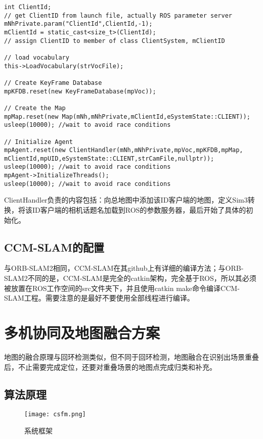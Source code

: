 \begin{verbatim}
int ClientId;
// get ClientID from launch file, actually ROS parameter server
mNhPrivate.param("ClientId",ClientId,-1);
mClientId = static_cast<size_t>(ClientId);
// assign ClientID to member of class ClientSystem, mClientID

// load vocabulary
this->LoadVocabulary(strVocFile);

// Create KeyFrame Database
mpKFDB.reset(new KeyFrameDatabase(mpVoc));

// Create the Map
mpMap.reset(new Map(mNh,mNhPrivate,mClientId,eSystemState::CLIENT));
usleep(10000); //wait to avoid race conditions

// Initialize Agent
mpAgent.reset(new ClientHandler(mNh,mNhPrivate,mpVoc,mpKFDB,mpMap,
mClientId,mpUID,eSystemState::CLIENT,strCamFile,nullptr));
usleep(10000); //wait to avoid race conditions
mpAgent->InitializeThreads();
usleep(10000); //wait to avoid race conditions
\end{verbatim}

ClientHandler负责的内容包括：向总地图中添加该ID客户端的地图，定义Sim3转换，将该ID客户端的相机话题名加载到ROS的参数服务器，最后开始了具体的初始化。


\subsection{CCM-SLAM的配置}

与ORB-SLAM2相同，CCM-SLAM在其github上有详细的编译方法；与ORB-SLAM2不同的是，CCM-SLAM是完全的catkin架构，完全基于ROS，所以其必须被放置在ROS工作空间的src文件夹下，并且使用catkin make命令编译CCM-SLAM工程。需要注意的是最好不要使用全部线程进行编译。


\section{多机协同及地图融合方案}

地图的融合原理与回环检测类似，但不同于回环检测，地图融合在识别出场景重叠后，不止需要完成定位，还要对重叠场景的地图点完成归类和补充。

\subsection{算法原理} \label{3.4.1}

\begin{figure}[!ht]
	\centering
	\texttt{[image: csfm.png]}
	\caption{系统框架}
	\label{fig13}
\end{figure}

